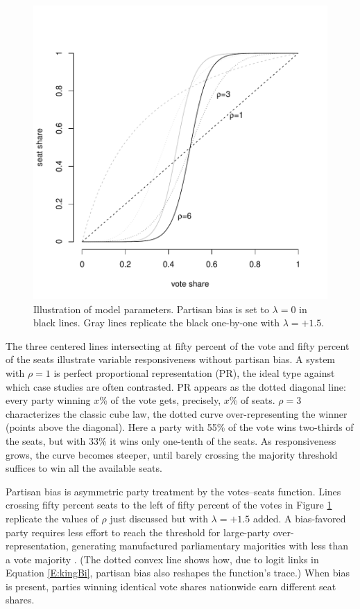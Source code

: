 \documentclass[letter,12pt]{article}
\begin{document}

\begin{figure}
\begin{center}
    \includegraphics[width=.55\columnwidth]{rhoExample.pdf} 
\caption{Illustration of model parameters. Partisan bias is set to $\lambda=0$ in black lines. Gray lines replicate the black one-by-one with $\lambda=+1.5$.}\label{F:lambdaRhoEx}
\end{center}
\end{figure}

The three centered lines intersecting at fifty percent of the vote and fifty percent of the seats illustrate variable responsiveness without partisan bias. A system with $\rho=1$ is perfect proportional representation (PR), the ideal type against which case studies are often contrasted. PR appears as the dotted diagonal line: every party winning $x$\% of the vote gets, precisely, $x$\% of seats. $\rho=3$ characterizes the classic cube law, the dotted curve over-representing the winner (points above the diagonal). Here a party with 55\% of the vote wins two-thirds of the seats, but with 33\% it wins only one-tenth of the seats. As responsiveness grows, the curve becomes steeper, until barely crossing the majority threshold suffices to win all the available seats. 

Partisan bias is asymmetric party treatment by the votes--seats function. Lines crossing fifty percent seats to the left of fifty percent of the votes in Figure \ref{F:lambdaRhoEx} replicate the values of $\rho$ just discussed but with $\lambda = +1.5$ added. A bias-favored party requires less effort to reach the threshold for large-party over-representation, generating manufactured parliamentary majorities with less than a vote majority \citep{lijphartElSysPtySys.1994}. (The dotted convex line shows how, due to logit links in Equation \ref{E:kingBi}, partisan bias also reshapes the function's trace.) When bias is present, parties winning identical vote shares nationwide earn different seat shares. 
\end{document}
